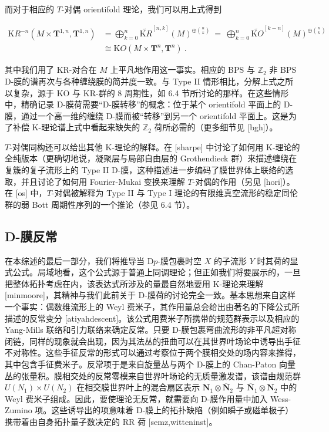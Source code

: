 \documentclass[11pt,a4paper]{ctexart}
\newcommand{\SrcRange}[2]{\marginpar{\raggedright\footnotesize 原文 p.#1}}
\begin{document}
而对于相应的 \(T\)-对偶 orientifold 理论，我们可以用上式得到

\[\begin{matrix}
{\mathrm KR}^{-n}(M\times{\mathbf T}^{1,n},{\mathbf T}^{1,n})&=
\bigoplus_{k=0}^n\widetilde{\mathrm KR}^[n,k](M)^{\oplus\binom{n}{k}}~=~\bigoplus_{k=0}^n\widetilde{\mathrm KO}^[k-n](M)^{\oplus\binom{n}{k}}\\
&\cong{\mathrm KO}(M\times{\mathbf T}^n,{\mathbf T}^n) \ .
\end{matrix}\]

其中我们用了 KR-对合在 \(M\) 上平凡地作用这一事实。相应的 BPS 与 \({\mathbb{Z}}_2\) 非 BPS D-膜的谱再次与各种缠绕膜的简并度一致。与 Type II 情形相比，分解上式之所以复杂，源于 KO 与 KR-群的 8 周期性，如 6.4 节所讨论的那样。在这些情形中，精确记录 D-膜荷需要``D-膜转移''的概念：位于某个 orientifold 平面上的 D-膜，通过一个高一维的缠绕 D-膜而被``转移''到另一个 orientifold 平面上。这是为了补偿 K-理论谱上式中看起来缺失的 \({\mathbb{Z}}_2\) 荷所必需的（更多细节见 [bgh]）。

\(T\)-对偶同构还可以给出其他 K-理论的解释。在 [sharpe] 中讨论了如何用 K-理论的全纯版本（更确切地说，凝聚层与局部自由层的 Grothendieck 群）来描述缠绕在复簇的复子流形上的 Type II D-膜，这种描述进一步编码了膜世界体上联络的选取，并且讨论了如何用 Fourier-Mukai 变换来理解 \(T\)-对偶的作用（另见 [hori]）。在 [os] 中，\(T\)-对偶被解释为 Type II 与 Type I 理论的有限维真空流形的稳定同伦群的弱 Bott 周期性序列的一个推论（参见 6.4 节）。

\SrcRange{101}{101}
\subsection{D-膜反常}\label{d-ux819cux53cdux5e38}

在本综述的最后一部分，我们将推导当 D\(p\)-膜包裹时空 \(X\) 的子流形 \(Y\) 时其荷的显式公式。局域地看，这个公式源于普通上同调理论；但正如我们将要展示的，一旦把整体拓扑考虑在内，该表达式所涉及的量最自然地要用 K-理论来理解 [minmoore]，其精神与我们此前关于 D-膜荷的讨论完全一致。基本思想来自这样一个事实：偶数维流形上的 Weyl 费米子，其作用量总会给出由著名的下降公式所描述的反常变分 [atiyahdescent]。该公式用费米子所携带的规范群表示以及相应的 Yang-Mills 联络和引力联络来确定反常。只要 D-膜包裹弯曲流形的非平凡超对称闭链，同样的现象就会出现，因为其法丛的扭曲可以在其世界叶场论中诱导出手征不对称性。这些手征反常的形式可以通过考察位于两个膜相交处的场内容来推得，其中包含手征费米子。反常项于是来自旋量丛与两个 D-膜上的 Chan-Paton 向量丛的张量积。膜相交处的反常零模来自世界叶场论的无质量激发谱，该谱由规范群 \(U(N_1)\times U(N_2)\) 在相交膜世界叶上的混合扇区表示 \({\mathbf N}_1\otimes\overline{\mathbf N}_2\) 与 \(\overline{\mathbf N}_1\otimes{\mathbf N}_2\) 中的 Weyl 费米子组成。因此，要使理论无反常，就需要向 D-膜作用量中加入 Wess-Zumino 项。这些诱导出的项意味着 D-膜上的拓扑缺陷（例如瞬子或磁单极子）携带着由自身拓扑量子数决定的 RR 荷 [semz,witteninst]。
\end{document}
